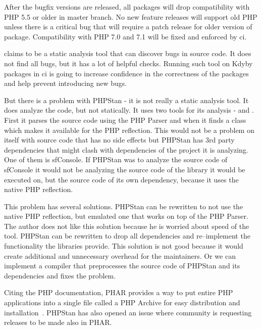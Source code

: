 
After the bugfix versions are released, all packages will drop compatibility with PHP 5.5 or older in master branch. No new feature releases will support old PHP unless there is a critical bug that will require a patch release for older version of package. Compatibility with PHP 7.0 and 7.1 will be fixed and enforced by \gls{ci}.


 claims to be a static analysis tool that can discover bugs in source code. It does not find all bugs, but it has a lot of helpful checks. Running such tool on Kdyby packages in \gls{ci} is going to increase confidence in the correctness of the packages and help prevent introducing new bugs.

But there is a problem with PHPStan - it is not really a static analysis tool. It does analyze the code, but not statically. It uses two tools for its analysis -  and . First it parses the source code using the PHP Parser and when it finds a class  which makes it available for the PHP reflection. This would not be a problem on itself with source code that has no side effects but PHPStan has 3rd party dependencies that might clash with dependencies of the project it is analyzing. One of them is \gls{sfConsole}. If PHPStan was to analyze the source code of \gls{sfConsole} it would not be analyzing the source code of the library it would be executed on, but the source code of its own dependency, because it uses the native PHP reflection.

This problem has several solutions. PHPStan can be rewritten to not use the native PHP reflection, but emulated one that works on top of the PHP Parser. The author does not like this solution because he is worried about speed of the tool. PHPStan can be rewritten to drop all dependencies and re--implement the functionality the libraries provide. This solution is not good because it would create additional and unnecessary overhead for the maintainers. Or we can implement a compiler that preprocesses the source code of PHPStan and its dependencies and fixes the problem.

Citing the PHP documentation, PHAR provides a way to put entire PHP applications into a single file called a PHP Archive for easy distribution and installation~\cite{php:phar}. PHPStan has also opened an issue  where community is requesting releases to be made also in PHAR.


